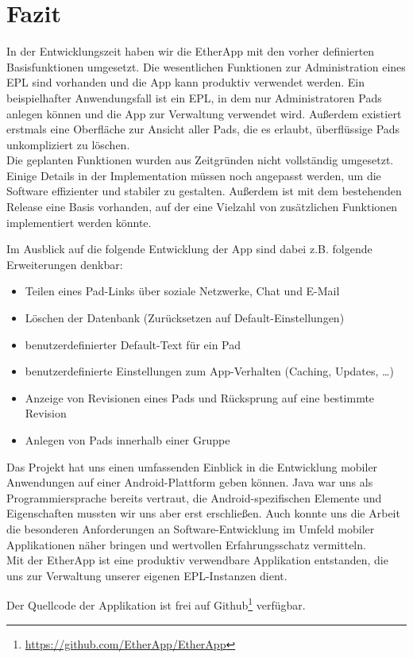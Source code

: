 \section{Fazit}
In der Entwicklungszeit haben wir die EtherApp mit den vorher definierten Basisfunktionen umgesetzt.
Die wesentlichen Funktionen zur Administration eines EPL sind vorhanden und die App kann produktiv verwendet werden.
Ein beispielhafter Anwendungsfall ist ein EPL, in dem nur Administratoren Pads anlegen können und die App zur Verwaltung verwendet wird.
Außerdem existiert erstmals eine Oberfläche zur Ansicht aller Pads, die es erlaubt, überflüssige Pads unkompliziert zu löschen.\\
Die geplanten Funktionen wurden aus Zeitgründen nicht vollständig umgesetzt.
Einige Details in der Implementation müssen noch angepasst werden, um die Software effizienter und stabiler zu gestalten.
Außerdem ist mit dem bestehenden Release eine Basis vorhanden, auf der eine Vielzahl von zusätzlichen Funktionen implementiert werden könnte.

\newpage
Im Ausblick auf die folgende Entwicklung der App sind dabei z.B. folgende Erweiterungen denkbar:

\begin{itemize}
	\item Teilen eines Pad-Links über soziale Netzwerke, Chat und E-Mail
	\item Löschen der Datenbank (Zurücksetzen auf Default-Einstellungen)
	\item benutzerdefinierter Default-Text für ein Pad
	\item benutzerdefinierte Einstellungen zum App-Verhalten (Caching, Updates, …)
	\item Anzeige von Revisionen eines Pads und Rücksprung auf eine bestimmte Revision
	\item Anlegen von Pads innerhalb einer Gruppe
\end{itemize}

Das Projekt hat uns einen umfassenden Einblick in die Entwicklung mobiler Anwendungen auf einer Android-Plattform geben können.
Java war uns als Programmiersprache bereits vertraut, die Android-spezifischen Elemente und Eigenschaften mussten wir uns aber erst erschließen.
Auch konnte uns die Arbeit die besonderen Anforderungen an Software-Entwicklung im Umfeld mobiler Applikationen näher bringen und wertvollen Erfahrungsschatz vermitteln.\\
Mit der EtherApp ist eine produktiv verwendbare Applikation entstanden, die uns zur Verwaltung unserer eigenen EPL-Instanzen dient.

Der Quellcode der Applikation ist frei auf Github\footnote{\url{https://github.com/EtherApp/EtherApp}} verfügbar.
